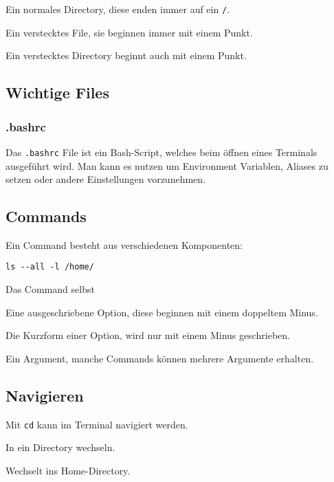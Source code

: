 \documentclass{article}
\begin{document}
Ein normales Directory, diese enden immer auf ein \texttt{/}.

Ein verstecktes File, sie beginnen immer mit einem Punkt.

Ein verstecktes Directory beginnt auch mit einem Punkt.

\subsection{Wichtige Files}
\subsubsection{.bashrc}
Das \texttt{.bashrc} File ist ein Bash-Script, welches beim öffnen eines Terminals ausgeführt wird.
Man kann es nutzen um Environment Variablen, Aliases zu setzen oder andere Einstellungen vorzunehmen.

\subsection{Commands}
Ein Command besteht aus verschiedenen Komponenten:

\begin{verbatim}
ls --all -l /home/
\end{verbatim}

 Das Command selbst

Eine ausgeschriebene Option, diese beginnen mit einem doppeltem Minus.

Die Kurzform einer Option, wird nur mit einem Minus geschrieben.

Ein Argument, manche Commands können mehrere Argumente erhalten.

\subsection{Navigieren}
Mit \texttt{cd} kann im Terminal navigiert werden.

In ein Directory wechseln.

Wechselt ins Home-Directory.
\end{document}
